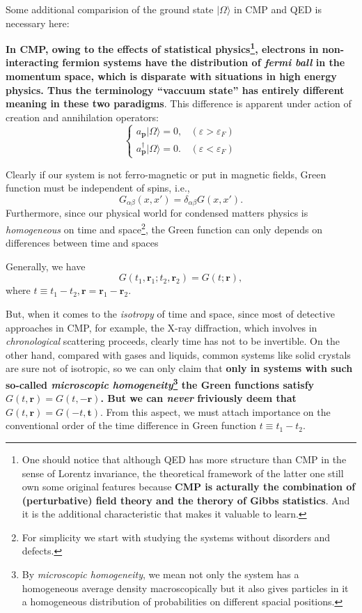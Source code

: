 \documentclass[b5paper,10pt,UTF8]{book}
\numberwithin{equation}{section}
\begin{document}
		\begin{Note}
			Some additional comparision of the ground state $|\Omega\rangle$ in CMP and QED is necessary here:\par
			\textbf{In CMP, owing to the effects of statistical physics\footnote{One should notice that although QED has more structure than CMP in the sense of Lorentz invariance, the theoretical framework of the latter one still own some original features because \textbf{CMP is acturally the combination of (perturbative) field theory and the therory of Gibbs statistics}. And it is the additional characteristic that makes it valuable to learn.}, electrons in non-interacting fermion systems have the distribution of \emph{fermi ball} in the momentum space, which is disparate with situations in high energy physics. Thus the terminology ``vaccuum state'' has entirely different meaning in these two paradigms}. This difference is apparent under action of creation and annihilation operators:
			$$\begin{cases}a_{\bm{p}}|\Omega\rangle=0,&(\varepsilon>\varepsilon_F)\\a_{\bm{p}}^\dagger|\Omega\rangle=0.&(\varepsilon<\varepsilon_F)\end{cases}$$
		\end{Note}
		\hfill\par
		Clearly if our system is not ferro-magnetic or put in magnetic fields, Green function must be independent of spins, i.e.,
		$$G_{\alpha\beta}(x,x')=\delta_{\alpha\beta}G(x,x').$$
		\indent Furthermore, since our physical world for condensed matters physics is \emph{homogeneous} on time and space\footnote{For simplicity we start with studying the systems without disorders and defects.}, the Green function can only depends on differences between time and spaces
		\begin{Assertion}
			Generally, we have
			\begin{equation}\label{2.2.3}
				G(t_1,\bm{r}_1;t_2,\bm{r}_2)=G(t;\bm{r}),
			\end{equation}
			where $t\equiv t_1-t_2, \bm{r}=\bm{r}_1-\bm{r}_2$.
		\end{Assertion}
		But, when it comes to the \emph{isotropy} of time and space, since most of detective approaches in CMP, for example, the X-ray diffraction, which involves in \emph{chronological} scattering proceeds, clearly time has not to be invertible. On the other hand, compared with gases and liquids, common systems like solid crystals are sure not of isotropic, so we can only claim that \textbf{only in systems with such so-called \emph{microscopic homogeneity}\footnote{By \emph{microscopic homogeneity}, we mean not only the system has a homogeneous average density macroscopically but it also gives particles in it a homogeneous distribution of probabilities on different spacial positions.} the Green functions satisfy $G(t,\bm{r})=G(t,-\bm{r})$. But we can \emph{never} friviously deem that $G(t,\bm{r})=G(-t,\bm{t})$}. From this aspect, we must attach importance on the conventional order of the time difference in Green function $t\equiv t_1-t_2$.
		
\end{document}
